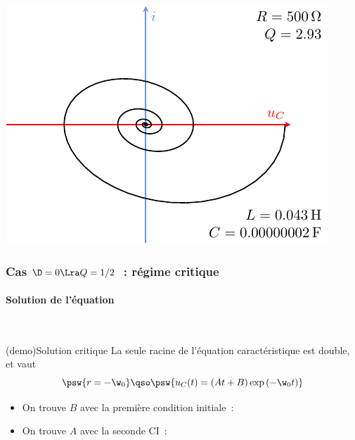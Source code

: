 \documentclass[../../main/main.tex]{subfiles}
\begin{document}
\begin{tcb}[breakable]
\begin{minipage}{0.49\linewidth}
\begin{center}
{			}{%
				\includegraphics[width=.7\linewidth]{carac-rlc_xy-3}
			}%
		\end{center}
	\end{minipage}
\end{tcb}

\subsubsection{Cas $\D = 0 \Lra Q = 1/2$~: régime critique}
\paragraph{Solution de l'équation}
~\smallbreak

\begin{tcb*}[label=demo:solupseudoper](demo){Solution critique}
	La seule racine de l'équation caractéristique est double, et vaut
	\[
		\psw{%
			r = -\w_0
		}%
		\qso
		\psw{%
			u_C(t) = (At+B)\exp \left(-\w_0t\right)
		}%
	\]
	\vspace{-20pt}
	\begin{itemize}
		\item On trouve $B$ avec la première condition initiale~:
		      \vspace{-15pt}
		\item On trouve $A$ avec la seconde CI~:
		      \vspace{-15pt}
	\end{itemize}
\end{tcb*}
\end{document}
